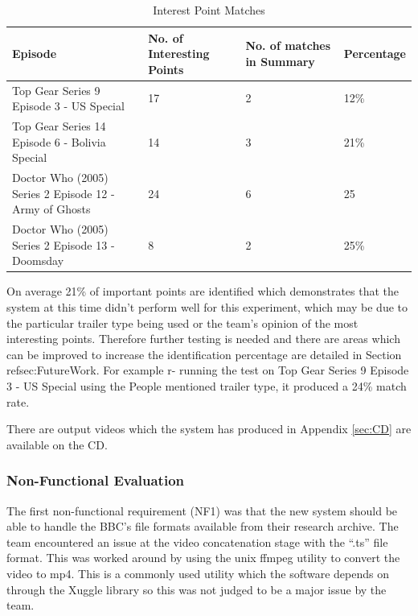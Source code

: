 \begin{center}
\begin{table}[ht]
\begin{tabular}{|p{150pt}|p{90pt}|p{90pt}|p{50pt}|}
\hline
\textbf{Episode}	&\textbf{No. of Interesting Points}	&\textbf{No. of matches in Summary}	&\textbf{Percentage}
\\\hline
Top Gear Series 9 Episode 3 - US Special&17	&2	&12\% \\\hline
Top Gear Series 14 Episode 6 - Bolivia Special&14	&3	&21\% \\\hline
Doctor Who (2005) Series 2 Episode 12 - Army of Ghosts&24	&6	&25 \\\hline
Doctor Who (2005) Series 2 Episode 13 - Doomsday	&8	&2	&25\% \\\hline
\end{tabular}
\caption{Interest Point Matches}
\end{table}
\end{center}

On average 21\% of important points are identified which demonstrates that the system at this time didn’t perform well for this experiment, which may be due to the particular trailer type being used or the team’s opinion of the most interesting points. Therefore further testing is needed and there are areas which can be improved to increase the identification percentage are detailed in Section ref{sec:FutureWork}.  For example r- running the test on Top Gear Series 9 Episode 3 - US Special using the People mentioned trailer type, it produced a 24\% match rate.

There are output videos which the system has produced in Appendix \ref{sec:CD} are available on the CD.

\subsubsection{Non-Functional Evaluation}
The first non-functional requirement (NF1) was that the new system should be able to handle the BBC’s file formats available from their research archive. The team encountered an issue at the video concatenation stage with the “.ts” file format. This was worked around by using the unix ffmpeg utility to convert the video to mp4. This is a commonly used utility which the software depends on through the Xuggle library so this was not judged to be a major issue by the team. 

